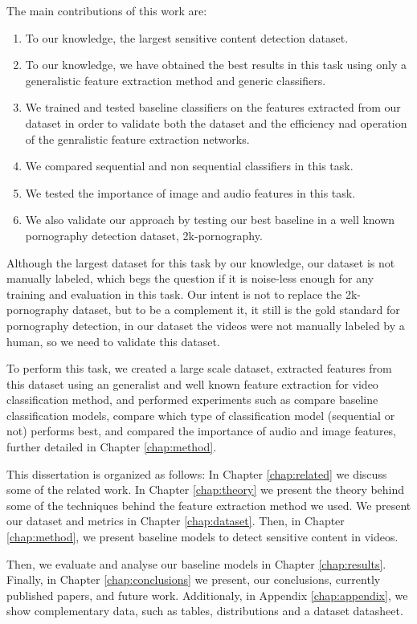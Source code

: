 The main contributions of this work are:
\begin{enumerate}
    \item To our knowledge, the largest sensitive content detection dataset.
    \item To our knowledge, we have obtained the best results in this task using only a generalistic feature extraction method and generic classifiers.
    \item We trained and tested baseline classifiers on the features extracted from our dataset in order to validate both the dataset and the efficiency nad operation of the genralistic feature extraction networks.  
    \item We compared sequential and non sequential classifiers in this task.
    \item We tested the importance of image and audio features in this task.
    \item We also validate our approach by testing our best baseline in a well known pornography detection dataset, 2k-pornography. 
\end{enumerate}
Although the largest dataset for this task by our knowledge, our dataset is not manually labeled, which begs the question if it is noise-less enough for any training and evaluation in this task.  
Our intent is not to replace the 2k-pornography dataset, but to be a complement it, it still is the gold standard for pornography detection, in our dataset the videos were not manually labeled by a human, so we need to validate this dataset.

To perform this task, we created a large scale dataset, extracted features from this dataset using an generalist and well known feature extraction for video classification method, and performed experiments such as compare baseline classification models, compare which type of classification model (sequential or not) performs best, and compared the importance of audio and image features, further detailed in Chapter \ref{chap:method}.

This dissertation is organized as follows:
In Chapter \ref{chap:related} we discuss some of the related work.
In Chapter \ref{chap:theory} we present the theory behind some of the techniques behind the feature extraction method we used.
We present our dataset and metrics in Chapter \ref{chap:dataset}.
Then, in Chapter \ref{chap:method}, we present baseline models to detect sensitive content in videos.

Then, we evaluate and analyse our baseline models in Chapter \ref{chap:results}.
Finally, in Chapter \ref{chap:conclusions} we present, our conclusions, currently published papers, and future work.
Additionaly, in Appendix \ref{chap:appendix}, we show complementary data, such as tables, distributions and a dataset datasheet.